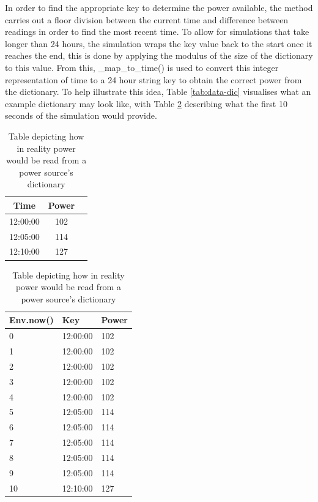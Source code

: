 \documentclass{l4proj}
\begin{document}
In order to find the appropriate key to determine the power available, the method carries out a floor division between the current time and difference between readings in order to find the most recent time.
To allow for simulations that take longer than 24 hours, the simulation wraps the key value back to the start once it reaches the end, this is done by applying the modulus of the size of the dictionary to this value.
From this, \_map\_to\_time() is used to convert this integer representation of time to a 24 hour string key to obtain the correct power from the dictionary.
To help illustrate this idea, Table \ref{tab:data-dic} visualises what an example dictionary may look like, with Table \ref{tab:time-explanation} describing what the first 10 seconds of the simulation would provide.
\begin{table}[h]
    \caption{Table depicting the data held in file}
    \label{tab:data-dic}
    \centering
    \begin{tabular}{@{}ccc@{}}
    \toprule
    \textbf{Time} & \textbf{Power} \\
    \midrule
    12:00:00      & 102            \\
    12:05:00      & 114            \\
    12:10:00      & 127            \\
    \bottomrule
    \end{tabular}

    \vspace{1em} %
    \caption{Table depicting how in reality power would be read from a power source's dictionary}
    \label{tab:time-explanation}
    \begin{tabular}{@{}lll@{}}
    \toprule
    \textbf{Env.now()}    & \textbf{Key}       & \textbf{Power}     \\
    \midrule
    0                     & 12:00:00           & 102                \\
    1                     & 12:00:00           & 102                \\
    2                     & 12:00:00           & 102                \\
    3                     & 12:00:00           & 102                \\
    4                     & 12:00:00           & 102                \\
    5                     & 12:05:00           & 114                \\
    6                     & 12:05:00           & 114                \\
    7                     & 12:05:00           & 114                \\
    8                     & 12:05:00           & 114                \\
    9                     & 12:05:00           & 114                \\
    10                    & 12:10:00           & 127                \\
    \bottomrule
    \end{tabular}
\end{table}
\end{document}
